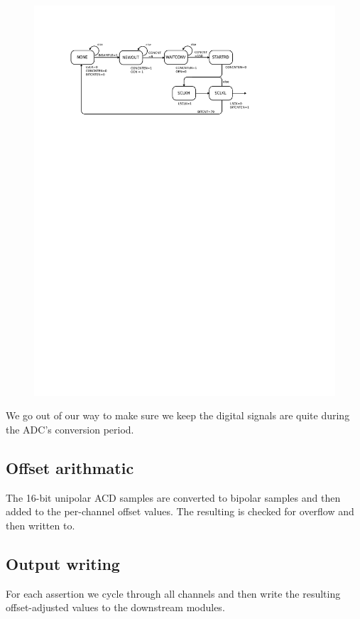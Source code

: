 \begin{figure}
\label{adcfsm}
\includegraphics[width=5in]{adc.inputFSM.svg}
\end{figure}

We go out of our way to make sure we keep the digital signals are quite during the ADC's conversion period. 

\subsection{Offset arithmatic}
The 16-bit unipolar ACD samples are converted to bipolar samples and then added to the per-channel offset values. The resulting  is checked for overflow and then written to. 

\subsection{Output writing}
For each  assertion we cycle through all channels and then write the resulting offset-adjusted values to the downstream modules. 
